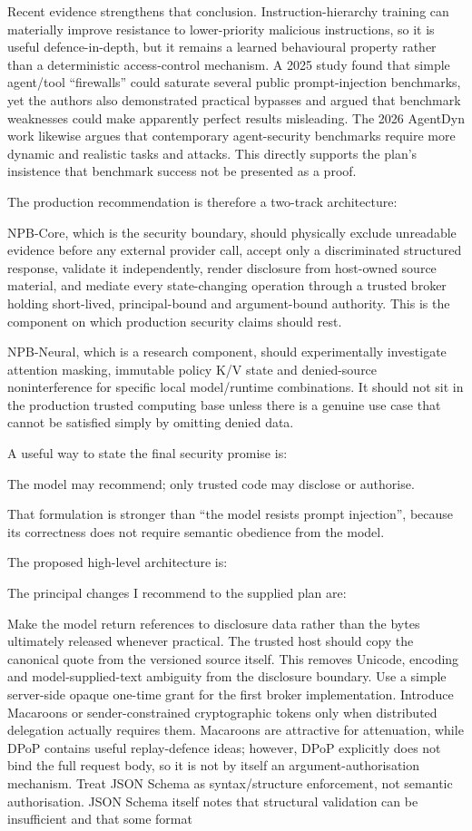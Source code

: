 \documentclass[11pt,a4paper]{article}
\begin{document}
Recent evidence strengthens that conclusion. Instruction-hierarchy training can materially improve resistance to lower-priority malicious instructions, so it is useful defence-in-depth, but it remains a learned behavioural property rather than a deterministic access-control mechanism. A 2025 study found that simple agent/tool “firewalls” could saturate several public prompt-injection benchmarks, yet the authors also demonstrated practical bypasses and argued that benchmark weaknesses could make apparently perfect results misleading. The 2026 AgentDyn work likewise argues that contemporary agent-security benchmarks require more dynamic and realistic tasks and attacks. This directly supports the plan's insistence that benchmark success not be presented as a proof.\par
The production recommendation is therefore a two-track architecture:\par
NPB-Core, which is the security boundary, should physically exclude unreadable evidence before any external provider call, accept only a discriminated structured response, validate it independently, render disclosure from host-owned source material, and mediate every state-changing operation through a trusted broker holding short-lived, principal-bound and argument-bound authority. This is the component on which production security claims should rest.\par
NPB-Neural, which is a research component, should experimentally investigate attention masking, immutable policy K/V state and denied-source noninterference for specific local model/runtime combinations. It should not sit in the production trusted computing base unless there is a genuine use case that cannot be satisfied simply by omitting denied data.\par
A useful way to state the final security promise is:\par
The model may recommend; only trusted code may disclose or authorise.\par
That formulation is stronger than “the model resists prompt injection”, because its correctness does not require semantic obedience from the model.\par
The proposed high-level architecture is:\par
The principal changes I recommend to the supplied plan are:\par
Make the model return references to disclosure data rather than the bytes ultimately released whenever practical. The trusted host should copy the canonical quote from the versioned source itself. This removes Unicode, encoding and model-supplied-text ambiguity from the disclosure boundary. Use a simple server-side opaque one-time grant for the first broker implementation. Introduce Macaroons or sender-constrained cryptographic tokens only when distributed delegation actually requires them. Macaroons are attractive for attenuation, while DPoP contains useful replay-defence ideas; however, DPoP explicitly does not bind the full request body, so it is not by itself an argument-authorisation mechanism. Treat JSON Schema as syntax/structure enforcement, not semantic authorisation. JSON Schema itself notes that structural validation can be insufficient and that some format\par
\end{document}
